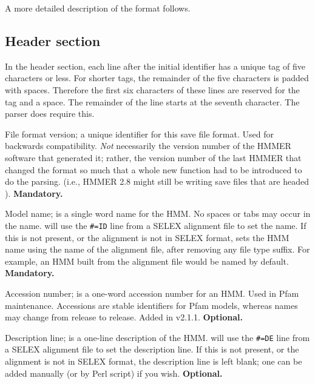 A more detailed description of the format follows.

\subsection{Header section}

In the header section, each line after the initial identifier has a
unique tag of five characters or less. For shorter tags, the remainder
of the five characters is padded with spaces. Therefore the first six
characters of these lines are reserved for the tag and a space. The
remainder of the line starts at the seventh character. The parser does
require this.

\begin{wideitem}

\item [\emprog{HMMER2.0}]
File format version; a unique identifier for this save file
format. Used for backwards compatibility. {\em Not} necessarily the
version number of the HMMER software that generated it; rather, the
version number of the last HMMER that changed the format so much
that a whole new function had to be introduced to do the parsing.
(i.e., HMMER 2.8 might
still be writing save files that are headed ).
\textbf{Mandatory.}

\item [\emprog{NAME  <s>}] Model name;  is a single word name for the HMM.
No spaces or tabs may occur in the name. 
 will use the \verb+#=ID+ line from a SELEX alignment
file to set the name. If this is not present, or the alignment
is not in SELEX format, 
sets the HMM name using the name of the alignment file, after removing any
file type suffix. For example, an HMM built from the alignment file
 would be named  by default.
\textbf{Mandatory.}

\item [\emprog{ACC   <s>}] Accession number;  is a one-word
accession number for an HMM. Used in Pfam maintenance. Accessions are
stable identifiers for Pfam models, whereas names may change from
release to release. Added in v2.1.1.  \textbf{Optional.}

\item [\emprog{DESC  <s>}] Description line;  is a one-line description 
of the HMM.  will use the \verb+#=DE+ line from a
SELEX alignment file to set the description line. If this is not
present, or the alignment is not in SELEX format, the description
line is left blank; one can be added manually (or by Perl script)
if you wish. \textbf{Optional.}


\end{wideitem}
